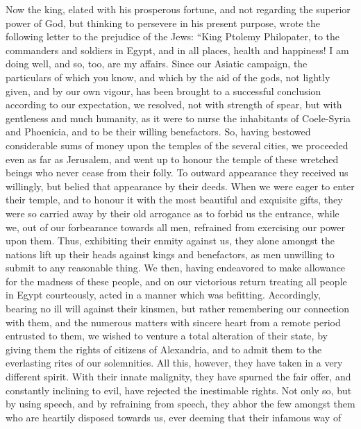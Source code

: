  Now the king, elated with his prosperous fortune, and not
regarding the superior power of God, but thinking to persevere in his
present purpose, wrote the following letter to the prejudice of the
Jews:  ``King Ptolemy Philopater, to the commanders and
soldiers in Egypt, and in all places, health and happiness!
 I am doing well, and so, too, are my affairs.
 Since our Asiatic campaign, the particulars of which you
know, and which by the aid of the gods, not lightly given, and by our
own vigour, has been brought to a successful conclusion according to our
expectation,  we resolved, not with strength of spear, but
with gentleness and much humanity, as it were to nurse the inhabitants
of Coele-Syria and Phoenicia, and to be their willing benefactors.
 So, having bestowed considerable sums of money upon the
temples of the several cities, we proceeded even as far as Jerusalem,
and went up to honour the temple of these wretched beings who never
cease from their folly.  To outward appearance they
received us willingly, but belied that appearance by their deeds. When
we were eager to enter their temple, and to honour it with the most
beautiful and exquisite gifts,  they were so carried away
by their old arrogance as to forbid us the entrance, while we, out of
our forbearance towards all men, refrained from exercising our power
upon them.  Thus, exhibiting their enmity against us, they
alone amongst the nations lift up their heads against kings and
benefactors, as men unwilling to submit to any reasonable thing.
 We then, having endeavored to make allowance for the
madness of these people, and on our victorious return treating all
people in Egypt courteously, acted in a manner which was befitting.
 Accordingly, bearing no ill will against their kinsmen,
but rather remembering our connection with them, and the numerous
matters with sincere heart from a remote period entrusted to them, we
wished to venture a total alteration of their state, by giving them the
rights of citizens of Alexandria, and to admit them to the everlasting
rites of our solemnities.  All this, however, they have
taken in a very different spirit. With their innate malignity, they have
spurned the fair offer, and constantly inclining to evil, 
have rejected the inestimable rights. Not only so, but by using speech,
and by refraining from speech, they abhor the few amongst them who are
heartily disposed towards us, ever deeming that their infamous way of
